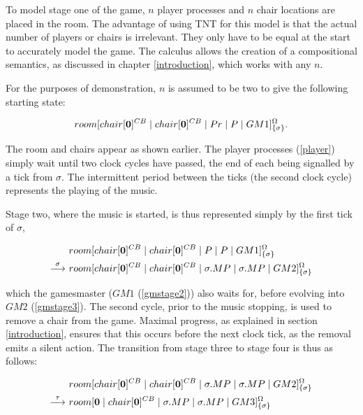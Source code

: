 To model stage one of the game, $n$ player processes and $n$ chair
locations are placed in the room.  The advantage of using TNT for this
model is that the actual number of players or chairs is irrelevant.
They only have to be equal at the start to accurately model the game.
The calculus allows the creation of a compositional semantics, as
discussed in chapter \ref{introduction}, which works with any $n$.

For the purposes of demonstration, $n$ is assumed to be two to give the
following starting state:

\begin{equation}
  {room}[ {chair}[ \textbf{0} ]^{CB} \;|\; {chair}[ \textbf{0} ]^{CB} \;|\; 
   Pr \;|\; P \;|\; GM1 ]^{\Omega}_{\{\sigma\}}.
\end{equation}

\noindent The room and chairs appear as shown earlier.  The player
processes (\ref{player}) simply wait until two clock
cycles have passed, the end of each being signalled by a tick from
$\sigma$.  The intermittent period between the ticks (the second clock
cycle) represents the playing of the music.  

Stage two, where the music is started, is thus represented simply by the
first tick of $\sigma$,

\begin{equation}
\begin{aligned}
  & {room}[ {chair}[ \textbf{0} ]^{CB} \;|\; {chair}[ \textbf{0} ]^{CB} \;|\; 
   P \;|\; P \;|\;
   GM1 ]^{\Omega}_{\{\sigma\}} \\
 \stackrel{\sigma}{\longrightarrow}\ & {room}[ {chair}[ \textbf{0} ]^{CB} \;|\; {chair}[ \textbf{0} ]^{CB} \;|\; 
   \sigma.MP \;|\; \sigma.MP \;|\;
   GM2 ]^{\Omega}_{\{\sigma\}}
\end{aligned}
\end{equation}

\noindent which the gamesmaster ($GM1$ (\ref{gmstage2})) also waits for,
before evolving into $GM2$ (\ref{gmstage3}).  The second cycle, prior
to the music stopping, is used to remove a chair from the game.  Maximal
progress, as explained in section \ref{introduction}, ensures that this
occurs before the next clock tick, as the removal emits a silent action.
The transition from stage three to stage four is thus as follows:

\begin{equation}
\begin{aligned}
& {room}[ {chair}[ \textbf{0} ]^{CB} \;|\; {chair}[ \textbf{0} ]^{CB} \;|\; 
   \sigma.MP \;|\; \sigma.MP \;|\;
   GM2 ]^{\Omega}_{\{\sigma\}} \\
 \stackrel{\tau}{\longrightarrow}\ & {room}[ \textbf{0} \;|\; {chair}[ \textbf{0} ]^{CB} \;|\; 
   \sigma.MP \;|\; \sigma.MP \;|\;
   GM3 ]^{\Omega}_{\{\sigma\}}
\end{aligned}
\end{equation}

